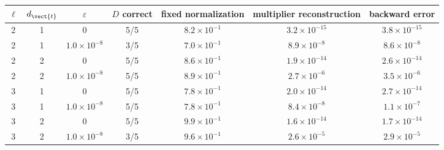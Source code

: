 \begin{tabular}{ccccccc}\hline
$\ell$ & $d_{\vect{t}}$ & $\varepsilon$ & $D$ correct & fixed normalization & multiplier reconstruction & backward error\\ \hline
2 & 1 & $0$ & 5/5 & $8.2\times 10^{-1}$ & $3.2\times 10^{-15}$ & $3.8\times 10^{-15}$\\
2 & 1 & $1.0\times 10^{-8}$ & 3/5 & $7.0\times 10^{-1}$ & $8.9\times 10^{-8}$ & $8.6\times 10^{-8}$\\
2 & 2 & $0$ & 5/5 & $8.6\times 10^{-1}$ & $1.9\times 10^{-14}$ & $2.6\times 10^{-14}$\\
2 & 2 & $1.0\times 10^{-8}$ & 5/5 & $8.9\times 10^{-1}$ & $2.7\times 10^{-6}$ & $3.5\times 10^{-6}$\\
3 & 1 & $0$ & 5/5 & $7.8\times 10^{-1}$ & $2.0\times 10^{-14}$ & $2.7\times 10^{-14}$\\
3 & 1 & $1.0\times 10^{-8}$ & 5/5 & $7.8\times 10^{-1}$ & $8.4\times 10^{-8}$ & $1.1\times 10^{-7}$\\
3 & 2 & $0$ & 5/5 & $9.9\times 10^{-1}$ & $1.6\times 10^{-14}$ & $1.7\times 10^{-14}$\\
3 & 2 & $1.0\times 10^{-8}$ & 3/5 & $9.6\times 10^{-1}$ & $2.6\times 10^{-5}$ & $2.9\times 10^{-5}$\\
\hline
\end{tabular}\\[2pt]
